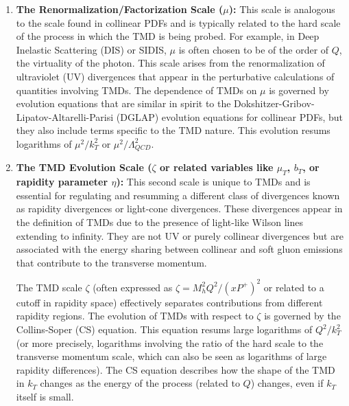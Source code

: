 \documentclass[11pt]{article}
\begin{document}
\begin{enumerate}
  \item \textbf{The Renormalization/Factorization Scale ($\mu$):} This scale is analogous to the scale found in collinear PDFs and is typically related to the hard scale of the process in which the TMD is being probed. For example, in Deep Inelastic Scattering (DIS) or SIDIS, $\mu$ is often chosen to be of the order of $Q$, the virtuality of the photon. This scale arises from the renormalization of ultraviolet (UV) divergences that appear in the perturbative calculations of quantities involving TMDs. The dependence of TMDs on $\mu$ is governed by evolution equations that are similar in spirit to the Dokshitzer-Gribov-Lipatov-Altarelli-Parisi (DGLAP) evolution equations for collinear PDFs, but they also include terms specific to the TMD nature. This evolution resums logarithms of $\mu^2/k_T^2$ or $\mu^2/\Lambda_{QCD}^2$.
  \item \textbf{The TMD Evolution Scale ($\zeta$ or related variables like $\mu_T$, $b_T$, or rapidity parameter $\eta$):} This second scale is unique to TMDs and is essential for regulating and resumming a different class of divergences known as rapidity divergences or light-cone divergences. These divergences appear in the definition of TMDs due to the presence of light-like Wilson lines extending to infinity. They are not UV or purely collinear divergences but are associated with the energy sharing between collinear and soft gluon emissions that contribute to the transverse momentum.

        The TMD scale $\zeta$ (often expressed as $\zeta = M_h^2 Q^2 / (x P^+)^2$ or related to a cutoff in rapidity space) effectively separates
        contributions from different rapidity regions. The evolution of TMDs with respect to $\zeta$ is governed by the Collins-Soper (CS) equation. This
        equation resums large logarithms of $Q^2/k_T^2$ (or more precisely, logarithms involving the ratio of the hard scale to the transverse momentum
        scale, which can also be seen as logarithms of large rapidity differences). The CS equation describes how the shape of the TMD in $k_T$ changes as
        the energy of the process (related to $Q$) changes, even if $k_T$ itself is small.
\end{enumerate}
\end{document}
